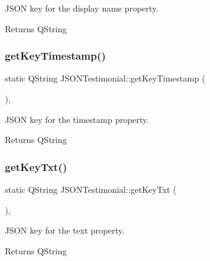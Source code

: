 J\+S\+ON key for the display name property. 

\begin{DoxyReturn}{Returns}
Q\+String 
\end{DoxyReturn}
\mbox{\label{struct_j_s_o_n_testimonial_a367b6f1aa534c14199888a0cf6dfe8df}} 
\subsubsection{\texorpdfstring{getKeyTimestamp()}{getKeyTimestamp()}}
{\footnotesize\ttfamily static Q\+String J\+S\+O\+N\+Testimonial\+::get\+Key\+Timestamp (\begin{DoxyParamCaption}{ }\end{DoxyParamCaption})\hspace{0.3cm}{\ttfamily [inline]}, {\ttfamily [static]}}



J\+S\+ON key for the timestamp property. 

\begin{DoxyReturn}{Returns}
Q\+String 
\end{DoxyReturn}
\mbox{\label{struct_j_s_o_n_testimonial_a5c08de626bca9d46be7728e8585d3638}} 
\subsubsection{\texorpdfstring{getKeyTxt()}{getKeyTxt()}}
{\footnotesize\ttfamily static Q\+String J\+S\+O\+N\+Testimonial\+::get\+Key\+Txt (\begin{DoxyParamCaption}{ }\end{DoxyParamCaption})\hspace{0.3cm}{\ttfamily [inline]}, {\ttfamily [static]}}



J\+S\+ON key for the text property. 

\begin{DoxyReturn}{Returns}
Q\+String 
\end{DoxyReturn}
\mbox{\label{struct_j_s_o_n_testimonial_a9fcbce44173627482821d8912f8531d5}} 
